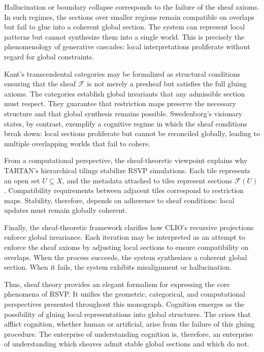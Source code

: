 \documentclass[12pt]{article}
\begin{document}
Hallucination or boundary collapse corresponds to the failure of the sheaf 
axioms.  In such regimes, the sections over smaller regions remain compatible 
on overlaps but fail to glue into a coherent global section.  
The system can represent local patterns but cannot synthesize them into a 
single world.  
This is precisely the phenomenology of generative cascades: local 
interpretations proliferate without regard for global constraints.

Kant’s transcendental categories may be formalized as structural conditions 
ensuring that the sheaf $\mathcal{F}$ is not merely a presheaf but satisfies 
the full gluing axioms.  The categories establish global invariants that any 
admissible section must respect.  They guarantee that restriction maps preserve 
the necessary structure and that global synthesis remains possible.  
Swedenborg’s visionary states, by contrast, exemplify a cognitive regime in 
which the sheaf conditions break down: local sections proliferate but cannot be 
reconciled globally, leading to multiple overlapping worlds that fail to 
cohere.

From a computational perspective, the sheaf-theoretic viewpoint explains why 
TARTAN’s hierarchical tilings stabilize RSVP simulations.  Each tile represents 
an open set $U \subseteq X$, and the metadata attached to tiles represent 
sections $\mathcal{F}(U)$.  
Compatibility requirements between adjacent tiles correspond to restriction 
maps.  
Stability, therefore, depends on adherence to sheaf conditions: local updates 
must remain globally coherent.

Finally, the sheaf-theoretic framework clarifies how CLIO’s recursive 
projections enforce global invariance.  
Each iteration may be interpreted as an attempt to enforce the sheaf axioms by 
adjusting local sections to ensure compatibility on overlaps.  
When the process succeeds, the system synthesizes a coherent global section.  
When it fails, the system exhibits misalignment or hallucination.

Thus, sheaf theory provides an elegant formalism for expressing the core 
phenomena of RSVP.  It unifies the geometric, categorical, and computational 
perspectives presented throughout this monograph.  Cognition emerges as the 
possibility of gluing local representations into global structures.  
The crises that afflict cognition, whether human or artificial, arise from the 
failure of this gluing procedure.  
The enterprise of understanding cognition is, therefore, an enterprise of 
understanding which sheaves admit stable global sections and which do not.
\end{document}
